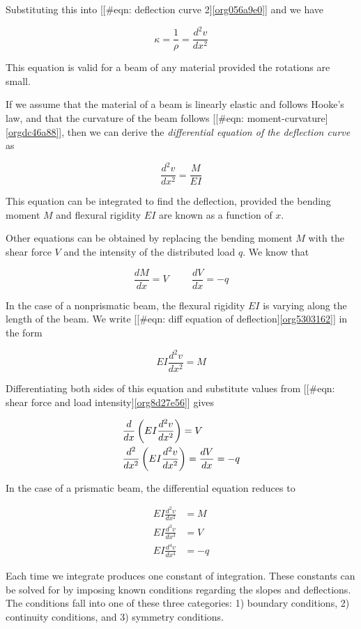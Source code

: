 \documentclass[a4paper,openany,12pt]{book}
\begin{document}
\begin{enumerate}
Substituting this into
[[\#eqn: deflection curve 2]\ref{org056a9e0}] and we have

$$\kappa  = \frac{1}{\rho } = \frac{d^2v}{dx^2}$$

This equation is valid for a beam of any material provided the rotations
are small.

If we assume that the material of a beam is linearly elastic and follows
Hooke's law, and that the curvature of the beam follows
[[\#eqn: moment-curvature]\ref{orgdc46a88}], then we can derive
the \emph{differential equation of the deflection curve} as

$$\frac{d^2v}{dx^2} = \frac{M}{EI}$$

This equation can be integrated to find the deflection, provided the
bending moment \(M\) and flexural rigidity \(EI\) are known as a function of
\(x\).

Other equations can be obtained by replacing the bending moment \(M\) with
the shear force \(V\) and the intensity of the distributed load \(q\). We
know that

$$\frac{dM}{dx} = V \hspace{1cm} \frac{dV}{dx} =  - q$$

In the case of a nonprismatic beam, the flexural rigidity \(EI\) is
varying along the length of the beam. We write
[[\#eqn: diff equation of deflection]\ref{org5303162}]
in the form

$$EI\frac{d^2v}{dx^2} = M$$

Differentiating both sides of this equation and substitute values from
[[\#eqn: shear force and load intensity]\ref{org8d27e56}]
gives

$$\begin{gathered}
    \frac{d}{dx}\left( EI\frac{d^2v}{dx^2} \right) = V \hfill \\
    \frac{d^2}{dx^2}\left( EI\frac{d^2v}{dx^2} \right) = \frac{dV}{dx} =  -q \hfill \\ 
  \end{gathered}$$

In the case of a prismatic beam, the differential equation reduces to

$$\begin{aligned}
  EI\frac{d^2v}{dx^2} &= M \nonumber \\
  EI\frac{d^3v}{dx^3} &= V \nonumber \\
  EI\frac{d^4v}{dx^4} &=  - q \end{aligned}$$

Each time we integrate produces one constant of integration. These
constants can be solved for by imposing known conditions regarding the
slopes and deflections. The conditions fall into one of these three
categories: 1) boundary conditions, 2) continuity conditions, and 3)
symmetry conditions.


\end{enumerate}
\end{document}
